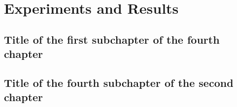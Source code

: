 \chapter{Experiments and Results}
\label{chap:ExperimentsAndResults}

\section{Title of the first subchapter of the fourth chapter}

\section{Title of the fourth subchapter of the second chapter}
